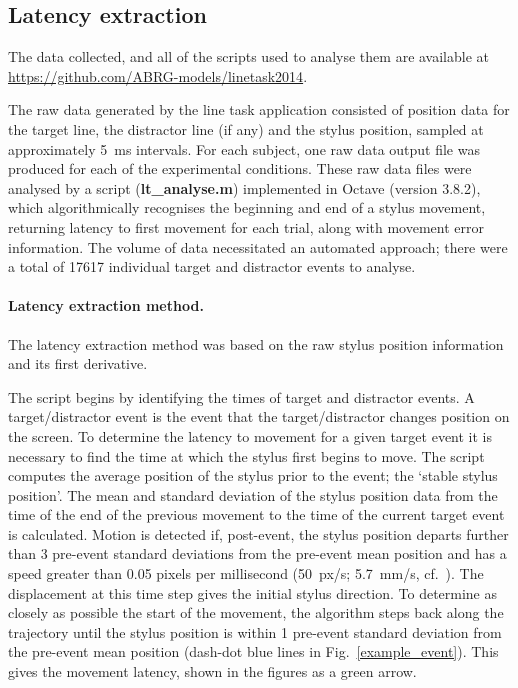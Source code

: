 \documentclass[10pt,letterpaper]{article}
\newcommand{\filename}[1]{\textsf{\textbf{#1}}}
\begin{document}
\subsection*{Latency extraction}
The data collected, and all of the scripts used to analyse them are
available at \url{https://github.com/ABRG-models/linetask2014}.

The raw data generated by the line task application consisted of
position data for the target line, the distractor line (if any) and
the stylus position, sampled at approximately 5~ms intervals. For each
subject, one raw data output file was produced for each of the
experimental conditions.  These raw data files were analysed by a
script (\filename{lt\_analyse.m}) implemented in Octave (version
3.8.2), which algorithmically recognises the beginning and end of a
stylus movement, returning latency to first movement for each trial,
along with movement error information. The volume of data necessitated
an automated approach; there were a total of 17617 individual target
and distractor events to analyse.

\paragraph{Latency extraction method.} The latency extraction
method was based on the raw stylus position information and its first
derivative.

The script begins by identifying the times of target and distractor
events. A target/distractor event is the event that the
target/distractor changes position on the screen. To determine the
latency to movement for a given target event it is necessary to find
the time at which the stylus first begins to move. The script computes
the average position of the stylus prior to the event; the `stable
stylus position'. The mean and standard deviation of the stylus
position data from the time of the end of the previous movement to the
time of the current target event is calculated.  Motion is detected
if, post-event, the stylus position departs further than 3 pre-event
standard deviations from the pre-event mean position and has a speed
greater than 0.05 pixels per millisecond (50~px/s; 5.7~mm/s,
cf.~\cite{prablanc_optimal_1979}).  The displacement at this time step
gives the initial stylus direction. To determine as closely as
possible the start of the movement, the algorithm steps back along the
trajectory until the stylus position is within 1 pre-event standard
deviation from the pre-event mean position (dash-dot blue lines in
Fig.~\ref{example_event}). This gives the movement latency, shown in
the figures as a green arrow.
\end{document}
